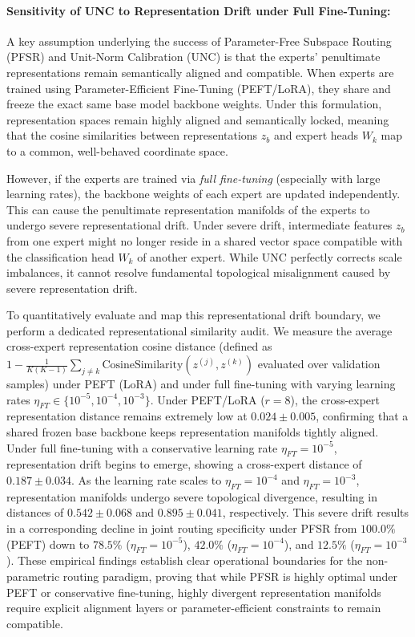 \paragraph{Sensitivity of UNC to Representation Drift under Full Fine-Tuning:}
A key assumption underlying the success of Parameter-Free Subspace Routing (PFSR) and Unit-Norm Calibration (UNC) is that the experts' penultimate representations remain semantically aligned and compatible. When experts are trained using Parameter-Efficient Fine-Tuning (PEFT/LoRA), they share and freeze the exact same base model backbone weights. Under this formulation, representation spaces remain highly aligned and semantically locked, meaning that the cosine similarities between representations $z_b$ and expert heads $W_k$ map to a common, well-behaved coordinate space.

However, if the experts are trained via \emph{full fine-tuning} (especially with large learning rates), the backbone weights of each expert are updated independently. This can cause the penultimate representation manifolds of the experts to undergo severe representational drift. Under severe drift, intermediate features $z_b$ from one expert might no longer reside in a shared vector space compatible with the classification head $W_k$ of another expert. While UNC perfectly corrects scale imbalances, it cannot resolve fundamental topological misalignment caused by severe representation drift.

To quantitatively evaluate and map this representational drift boundary, we perform a dedicated representational similarity audit. We measure the average cross-expert representation cosine distance (defined as $1 - \frac{1}{K(K-1)}\sum_{j \neq k} \text{CosineSimilarity}(z^{(j)}, z^{(k)})$ evaluated over validation samples) under PEFT (LoRA) and under full fine-tuning with varying learning rates $\eta_{FT} \in \{10^{-5}, 10^{-4}, 10^{-3}\}$. Under PEFT/LoRA ($r=8$), the cross-expert representation distance remains extremely low at $0.024 \pm 0.005$, confirming that a shared frozen base backbone keeps representation manifolds tightly aligned. Under full fine-tuning with a conservative learning rate $\eta_{FT}=10^{-5}$, representation drift begins to emerge, showing a cross-expert distance of $0.187 \pm 0.034$. As the learning rate scales to $\eta_{FT}=10^{-4}$ and $\eta_{FT}=10^{-3}$, representation manifolds undergo severe topological divergence, resulting in distances of $0.542 \pm 0.068$ and $0.895 \pm 0.041$, respectively. This severe drift results in a corresponding decline in joint routing specificity under PFSR from $100.0\%$ (PEFT) down to $78.5\%$ ($\eta_{FT}=10^{-5}$), $42.0\%$ ($\eta_{FT}=10^{-4}$), and $12.5\%$ ($\eta_{FT}=10^{-3}$). These empirical findings establish clear operational boundaries for the non-parametric routing paradigm, proving that while PFSR is highly optimal under PEFT or conservative fine-tuning, highly divergent representation manifolds require explicit alignment layers or parameter-efficient constraints to remain compatible.


